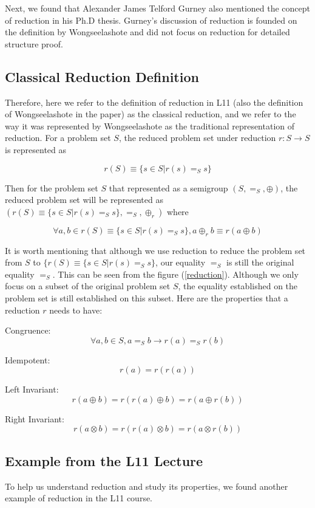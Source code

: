 \documentclass[a4paper,12pt,twoside,openright]{report}
\newcommand{\e}[2]{
\begin{equation}
  \label{#1} 
  #2
\end{equation}
}
\begin{document}
Next, we found that Alexander James Telford Gurney also mentioned the concept of reduction in his Ph.D thesis\cite{gurney_construction_2010}. Gurney's discussion of reduction is founded on the definition by Wongseelashote and did not focus on reduction for detailed structure proof.

\subsection{Classical Reduction Definition}
Therefore, here we refer to the definition of reduction in L11 (also the definition of Wongseelashote in the paper) as the classical reduction, and we refer to the way it was represented by Wongseelashote as the traditional representation of reduction.
For a problem set $S$, the reduced problem set under reduction $r: S \rightarrow S$ is represented as 
\e{r:def:traditional}{r(S) \equiv \{s \in S | r(s) =_S s\}}
Then for the problem set $S$ that represented as a semigroup $(S,=_S,\oplus)$, the reduced problem set will be represented as $({r(S) \equiv \{s \in S | r(s) =_S s\}},=_S,\oplus_r)$ where 
\e{r:def:binary_operator}{\forall a, b \in r(S) \equiv \{s \in S | r(s) =_S s\}, a \oplus_r b \equiv r(a \oplus b)}
It is worth mentioning that although we use reduction to reduce the problem set from $S$ to $\{r(S) \equiv \{s \in S | r(s) =_S s\}$, our equality $=_S$ is still the original equality $=_S$. 
This can be seen from the figure (\ref{reduction}). Although we only focus on a subset of the original problem set $S$, the equality established on the problem set is still established on this subset. 
Here are the properties that a reduction $r$ needs to have:

Congruence: \e{r:def:congruence}{\forall a,b \in S, a =_S b \rightarrow r(a) =_S r(b)}
Idempotent: \e{r:def:idempotent}{r(a) = r(r(a))} 
Left Invariant: \e{r:def:left_invariant}{r(a\oplus b) = r(r(a)\oplus b) = r(a\oplus r(b))}
Right Invariant: \e{r:def:right_invariant}{r(a\otimes b) = r(r(a)\otimes b) = r(a\otimes r(b))}

\subsection{Example from the L11 Lecture}
To help us understand reduction and study its properties, we found another example of reduction in the L11 course.
\end{document}
